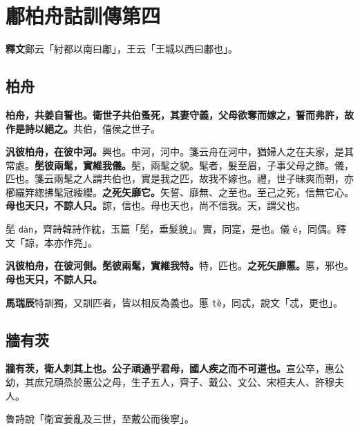 \chapter{鄘柏舟詁訓傳第四}

\begin{quoting}\textbf{釋文}鄭云「紂都以南曰鄘」，王云「王城以西曰鄘也」。\end{quoting}

\section{柏舟}


\textbf{柏舟，共姜自誓也。衛世子共伯蚤死，其妻守義，父母欲奪而嫁之，誓而弗許，故作是詩以絕之。}{\footnotesize 共伯，僖侯之世子。}

\textbf{汎彼柏舟，在彼中河。}{\footnotesize 興也。中河，河中。箋云舟在河中，猶婦人之在夫家，是其常處。}\textbf{髧彼兩髦，實維我儀。}{\footnotesize 髧，兩髦之貌。髦者，髮至眉，子事父母之飾。儀，匹也。箋云兩髦之人謂共伯也，實是我之匹，故我不嫁也。禮，世子昧爽而朝，亦櫛纚筓緫拂髦冠緌纓。}\textbf{之死矢靡它。}{\footnotesize 矢誓、靡無、之至也。至己之死，信無它心。}\textbf{母也天只，不諒人只。}{\footnotesize 諒，信也。母也天也，尚不信我。天，謂父也。}

\begin{quoting}髧 \texttt{dàn}，齊詩韓詩作紞，玉篇「髧，垂髮貌」。實，同寔，是也。儀 \texttt{é}，同偶。釋文「諒，本亦作亮」。\end{quoting}

\textbf{汎彼柏舟，在彼河側。髧彼兩髦，實維我特。}{\footnotesize 特，匹也。}\textbf{之死矢靡慝。}{\footnotesize 慝，邪也。}\textbf{母也天只，不諒人只。}

\begin{quoting}\textbf{馬瑞辰}特訓獨，又訓匹者，皆以相反為義也。慝 \texttt{tè}，同忒，說文「忒，更也」。\end{quoting}

\section{牆有茨}


\textbf{牆有茨，衛人刺其上也。公子頑通乎君母，國人疾之而不可道也。}{\footnotesize 宣公卒，惠公幼，其庶兄頑烝於惠公之母，生子五人，齊子、戴公、文公、宋桓夫人、許穆夫人。}

\begin{quoting}魯詩說「衛宣姜亂及三世，至戴公而後寧」。\end{quoting}

